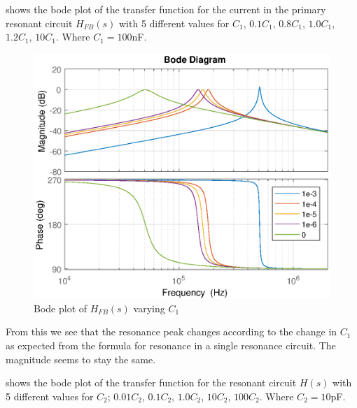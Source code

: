  shows the bode plot of the transfer function for the current in the primary resonant circuit $H_{FB}(s)$ with 5 different values for $C_1$, $0.1C_1$, $0.8C_1$, $1.0C_1$, $1.2C_1$, $10C_1$.  Where $C_1 = 100$nF.
\begin{figure}[H]
    \centering
    \includegraphics[width=\textwidth]{img/FeedBackBode_C1.eps}
    \caption{Bode plot of $H_{FB}(s)$ varying $C_1$}
    \label{fig:fbbode_c1}
\end{figure}

From this we see that the resonance peak changes according to the change in $C_1$ as expected from the formula for resonance in a single resonance circuit. The magnitude seems to stay the same.

\newpage
{} shows the bode plot of the transfer function for the resonant circuit $H(s)$ with 5 different values for $C_2$; $0.01C_2$, $0.1C_2$, $1.0C_2$, $10C_2$, $100C_2$. Where $C_2 = 10$pF.

